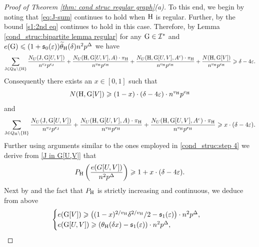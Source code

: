 \documentclass[a4paper,11pt,english,reqno]{amsart}
\numberwithin{equation}{section}
\renewcommand{\leq}{\leqslant}
\renewcommand{\geq}{\geqslant}
\newcommand{\uH}{\textup{H}}
\newcommand{\tu}[1]{\textup{#1}}
\begin{document}
\begin{proof}[Proof of Theorem \ref{thm: cond struc regular graph}(a)]
To this end, we begin by noting that \eqref{eq:J-sum} continues to hold when $\uH$ is regular. Further, by \cite[Lemma 5.2]{HMS} the bound \eqref{s1:2nd eq} continues to hold in this case. Therefore, by Lemma \ref{cond_struc:bipartite lemma regular} for any $\tu{G}\in \mathcal{I}^{*}$ and $e(\tu{G})\leq (1+\mathfrak{s}_{0}(\varepsilon)) \widetilde{\theta}_{\uH}(\delta)n^2 p^\Delta$ we have %
\begin{equation*}
	\sum_{\tu{J}\in Q_{\uH}\setminus\{\uH\}}\frac{N_{U}(\tu{J}, \tu{G}[U,V])}{n^{v_{\tu{J}}}p^{e_{\tu{J}}}}+\frac{N_{U}(\uH,\tu{G}[U,V], A)\cdot \pi_{\uH}}{n^{v_{\uH}}p^{e_{\uH}}} +\frac{N_{U}(\uH,\tu{G}[U,V], A^{c})\cdot \pi_{\uH}}{n^{v_{\uH}}p^{e_{\uH}}} + \frac{N(\uH, \tu{G}[V])}{n^{v_{\uH}}p^{e_{\uH}}}\geq \delta -4\varepsilon.
\end{equation*} 
Consequently there exists an $x\in [0,1]$ such that
\begin{equation}
	\label{H in G[V]}
	N(\uH,\tu{G}[V])\geq (1-x)\cdot(\delta-4\varepsilon)\cdot n^{v_{\uH}}p^{e_{\uH}}
\end{equation}
and 
\begin{equation}
	\label{J in G[U,V]}
	\sum_{\tu{J}\in Q_{\uH}\setminus\{\uH\}}\frac{N_{U}(\tu{J}, \tu{G}[U,V])}{n^{v_{\tu{J}}}p^{e_{\tu{J}}}}+\frac{N_{U}(\uH,\tu{G}[U,V], A)\cdot \pi_{\uH}}{n^{v_{\uH}}p^{e_{\uH}}} +\frac{N_{U}(\uH,\tu{G}[U,V], A^{c})\cdot \pi_{\uH}}{n^{v_{\uH}}p^{e_{\uH}}} \geq x\cdot(\delta-4\varepsilon).
\end{equation}
Further using arguments similar to the ones employed in \eqref{cond_struc:step 4} we derive from \eqref{J in G[U,V]} that
\begin{equation}
	\label{J in G[U,V]-new}
	P_{\uH}\left(\frac{e(G[U,V])}{n^{2}p^{\Delta}} \right) \geq 1+ x\cdot(\delta-4\varepsilon).
\end{equation}
Next by \cite[Theorem~5.4]{HMS} and the fact that $P_{\uH}$ is strictly increasing and continuous, we deduce from above
\begin{equation}
	\label{edge lower bound}
	\begin{cases}
		e(\tu{G}[V])\geq \left((1-x)^{2/v_{\uH}}\delta^{2/v_{\uH}}/2-\mathfrak{s}_{1}(\varepsilon)\right)\cdot n^{2}p^{\Delta},\\
		e(\tu{G}[U,V])\geq \left(\theta_{\uH}(\delta x)-\mathfrak{s}_{1}(\varepsilon)\right) \cdot n^{2}p^{\Delta},
	\end{cases}

\end{equation}
\end{proof}
\end{document}
